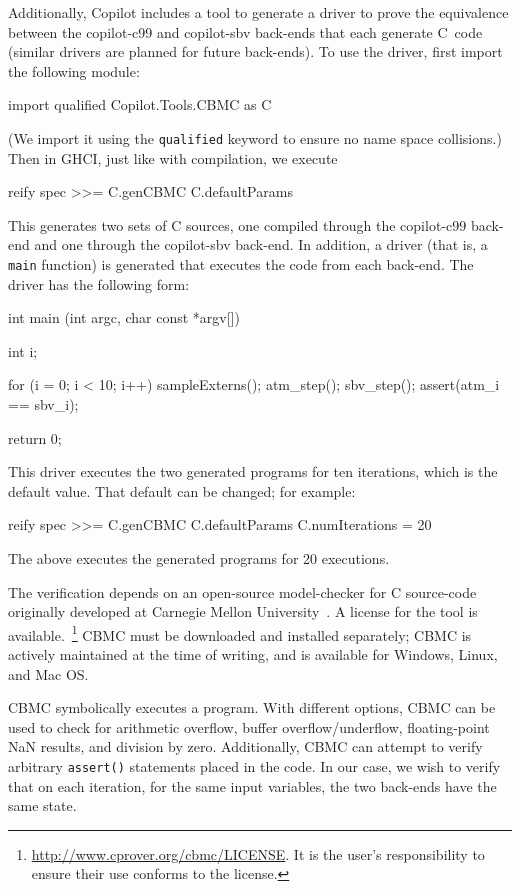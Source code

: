 \documentclass[]{article}
\theoremstyle{example}
\begin{document}
Additionally, Copilot includes a tool to generate a driver to prove the
equivalence between the copilot-c99 and copilot-sbv back-ends that each generate
C~code (similar drivers are planned for future back-ends).  To use the driver,
first import the following module:
%
\begin{code}
import qualified Copilot.Tools.CBMC as C
\end{code}
%
\noindent
(We import it using the {\tt qualified} keyword to ensure no name space
collisions.)  Then in GHCI, just like with compilation, we execute
%
\begin{code}
reify spec >>= C.genCBMC C.defaultParams  
\end{code}
%
\noindent
This generates two sets of C sources, one compiled through the copilot-c99
back-end and one through the copilot-sbv back-end.  In addition, a driver (that is, a
{\tt main} function) is generated that executes the code from each back-end.  The
driver has the following form:
%
\begin{code}
int main (int argc, char const *argv[])
{
  int i;

  for (i = 0; i < 10; i++)
  {
    sampleExterns();
    atm_step();
    sbv_step();
    assert(atm_i == sbv_i);
  }

  return 0;
}
\end{code}
%
This driver executes the two generated programs for ten iterations, which is the
default value.  That default can be changed; for example:
%
\begin{code}
reify spec >>= 
  C.genCBMC C.defaultParams {C.numIterations = 20}
\end{code}
%
\noindent
The above executes the generated programs for 20 executions.

The verification depends on an open-source model-checker for C source-code
originally developed at Carnegie Mellon University~\cite{cbmc}.  A license for
the tool is available.~\footnote{\url{http://www.cprover.org/cbmc/LICENSE}.  It
  is the user's responsibility to ensure their use conforms to the license.}
CBMC must be downloaded and installed separately; CBMC is actively maintained
at the time of writing, and is available for Windows, Linux, and Mac OS.

CBMC symbolically executes a program.  With different options, CBMC can be used
to check for arithmetic overflow, buffer overflow/underflow, floating-point NaN
results, and division by zero.  Additionally, CBMC can attempt to verify
arbitrary {\tt assert()} statements placed in the code.  In our case, we wish to
verify that on each iteration, for the same input variables, the two back-ends
have the same state.  
\end{document}
